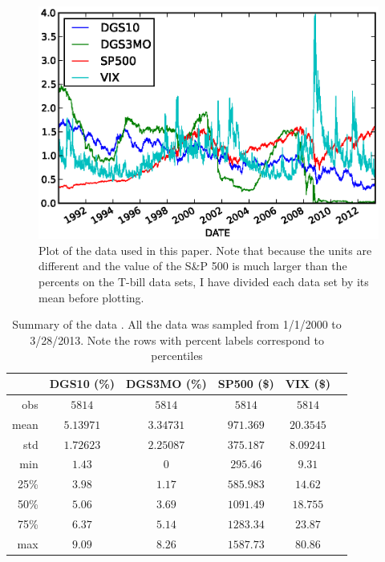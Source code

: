 \documentclass[a4paper, 11pt, twoside]{article}
\theoremstyle{definition} %
\numberwithin{equation}{section}
\begin{document}
    \begin{figure}[ht]
        \centering
        \includegraphics[width=6in]{./Figures/all_data.eps}
        \captionsetup{width=5.5in}
        \caption{\small Plot of the data used in this paper. Note that because the units are different and the value of the S\&P 500 is much larger than the percents on the T-bill data sets, I have divided each data set by its mean before plotting.}
        \label{fig:alldata}
    \end{figure}

    \begin{table}[ht!]
      \begin{center}
        \begin{tabular}{r|ccccc}
        \hline
           \rowcolor{gray!45}  & DGS10  (\%)& DGS3MO  (\%)& SP500 (\$)& VIX (\$)\\
          \hline
          \hline
          \rowcolor{gray!7} obs & $5814$ & $5814$ & $5814$ & $5814$\\
          \rowcolor{gray!23}mean & $5.13971$ & $3.34731$ & $971.369$ & $20.3545$\\
          \rowcolor{gray!7} std & $1.72623$ & $2.25087$ & $375.187$ & $8.09241$\\
          \rowcolor{gray!23}min & $1.43$ & $0$ & $295.46$ & $9.31$\\
          \rowcolor{gray!7} 25\% & $3.98$ & $1.17$ & $585.983$ & $14.62$\\
          \rowcolor{gray!23}50\% & $5.06$ & $3.69$ & $1091.49$ & $18.755$\\
          \rowcolor{gray!7} 75\% & $6.37$ & $5.14$ & $1283.34$ & $23.87$\\
          \rowcolor{gray!23}max & $9.09$ & $8.26$ & $1587.73$ & $80.86$\\
        \bottomrule
        \end{tabular}
        \captionsetup{width=5.5in}
        \caption{\small Summary of the data . All the data was sampled from 1/1/2000 to 3/28/2013. Note the rows with percent labels correspond to percentiles}
        \label{tab:describe}
      \end{center}
    \end{table}
\end{document}
